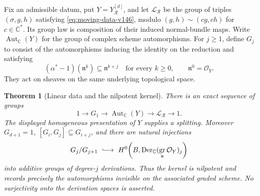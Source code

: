 \documentclass[11pt,reqno]{amsart}
\numberwithin{equation}{section}
\newtheorem{theorem}{Theorem}[section]
\theoremstyle{definition}\newtheorem{definition}[theorem]{Definition}
\theoremstyle{remark}\newtheorem{remark}[theorem]{Remark}
\newcommand{\C}{\mathbb C}\newcommand{\Q}{\mathbb Q}
\newcommand{\OO}{\mathcal O}\newcommand{\II}{\mathcal I}
\DeclareMathOperator{\gr}{gr}\DeclareMathOperator{\Gal}{Gal}
\begin{document}
Fix an admissible datum, put \(Y=Y_{\mathcal R}^{[d]}\), and let
\(\mathscr L_{\mathcal R}\) be the group of triples
\((\sigma,g,h)\) satisfying \eqref{eq:moving-data-v146}, modulo
\((g,h)\sim(cg,ch)\) for \(c\in\C^*\).  Its group law is
composition of their induced normal-bundle maps.  Write
\(\operatorname{Aut}_{\C}(Y)\) for the group of complex scheme
automorphisms.  For \(j\ge1\), define \(G_j\) to consist of the
automorphisms inducing the identity on the reduction and satisfying
\begin{equation}\label{eq:automorphism-filtration-v146}
 (\alpha^*-1)(\mathfrak n^k)\subseteq\mathfrak n^{k+j}
 \quad\text{for every }k\ge0,\qquad \mathfrak n^0=\OO_Y.
\end{equation}
They act on sheaves on the same underlying topological space.

\begin{theorem}[Linear data and the nilpotent kernel]
\label{thm:automorphism-kernel-v146}
There is an exact sequence of groups
\begin{equation}\label{eq:automorphism-sequence-v146}
 1\longrightarrow G_1\longrightarrow
 \operatorname{Aut}_{\C}(Y)\longrightarrow
 \mathscr L_{\mathcal R}\longrightarrow1.
\end{equation}
The displayed homogeneous presentation of \(Y\) supplies a splitting.
Moreover \(G_{d+1}=1\),
\([G_i,G_j]\subseteq G_{i+j}\), and there are natural injections
\begin{equation}\label{eq:automorphism-symbol-v146}
 G_j/G_{j+1}\ \lhook\joinrel\longrightarrow\
 H^0\!\left(B,\operatorname{Der}_{\C}
       (\gr_{\mathfrak n}\OO_Y)_j\right)
\end{equation}
into additive groups of degree-\(j\) derivations.  Thus the kernel is
nilpotent and records precisely the automorphisms invisible on the
associated graded scheme.  No surjectivity onto the derivation spaces
is asserted.
\end{theorem}
\end{document}

